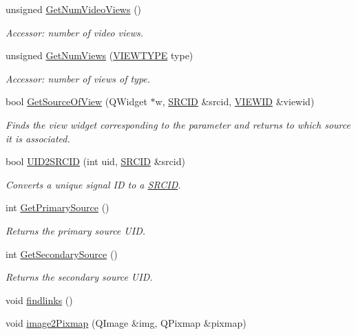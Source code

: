 \begin{CompactItemize}
unsigned \hyperlink{class_main_window_6339a32c7cb1668e33a4271d7457c467}{GetNumVideoViews} ()
\begin{CompactList}\small\item\em Accessor: number of video views. \item\end{CompactList}\item 
unsigned \hyperlink{class_main_window_159ab0e8d3086f521b6e1f16d0f9cbd6}{GetNumViews} (\hyperlink{data_8h_df19f45a6b4a54e345761faa6837c333}{VIEWTYPE} type)
\begin{CompactList}\small\item\em Accessor: number of views of type. \item\end{CompactList}\item 
bool \hyperlink{class_main_window_85941a865aac37aa9ab8a20dc7d618e4}{GetSourceOfView} (QWidget $\ast$w, \hyperlink{struct_s_r_c_i_d}{SRCID} \&srcid, \hyperlink{class_v_i_e_w_i_d}{VIEWID} \&viewid)
\begin{CompactList}\small\item\em Finds the view widget corresponding to the parameter and returns to which source it is associated. \item\end{CompactList}\item 
bool \hyperlink{class_main_window_c01dddc8c1010902718dc3eecd16540e}{UID2SRCID} (int uid, \hyperlink{struct_s_r_c_i_d}{SRCID} \&srcid)
\begin{CompactList}\small\item\em Converts a unique signal ID to a \hyperlink{struct_s_r_c_i_d}{SRCID}. \item\end{CompactList}\item 
int \hyperlink{class_main_window_88f79d4746ef5e14590f63fe213d55fd}{GetPrimarySource} ()
\begin{CompactList}\small\item\em Returns the primary source UID. \item\end{CompactList}\item 
int \hyperlink{class_main_window_7d9bdb92e89ed9711ca33d683a93e72f}{GetSecondarySource} ()
\begin{CompactList}\small\item\em Returns the secondary source UID. \item\end{CompactList}\item 
void \hyperlink{class_main_window_f6b2dd694749387c22e02c807e2f34c7}{findlinks} ()
\item 
void \hyperlink{class_main_window_1c69f8419d114c0acb6216ac0a17e712}{image2Pixmap} (QImage \&img, QPixmap \&pixmap)
\end{CompactItemize}
